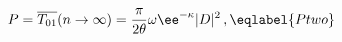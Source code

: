 \begin{equation}
P = \overline{T_{01}}(n\to\infty) = \frac{\pi}{2\theta} \omega
\ee^{-\kappa}
|D|^2 \,,
\eqlabel{Ptwo}
\end{equation}

